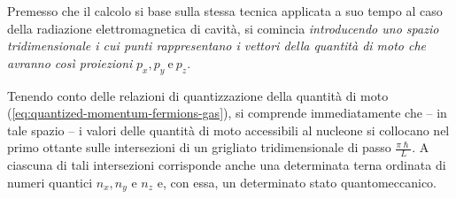 Premesso che il calcolo si base sulla stessa tecnica applicata a suo tempo al caso della radiazione elettromagnetica di cavità, si comincia \emph{introducendo uno spazio tridimensionale i cui punti rappresentano i vettori della quantità di moto che avranno così proiezioni} $p_x, p_y \ \text{e} \ p_z$.

Tenendo conto delle relazioni di quantizzazione della quantità di moto (\ref{eq:quantized-momentum-fermions-gas}), si comprende immediatamente che – in tale spazio – i valori delle quantità di moto accessibili al nucleone si collocano nel primo ottante sulle intersezioni di un grigliato tridimensionale di passo $\frac{\pi \hslash}{L}$.
A ciascuna di tali intersezioni corrisponde anche una determinata terna ordinata di numeri quantici $n_{x}, n_{y}$ e $n_{z}$ e, con essa, un determinato stato quantomeccanico.

